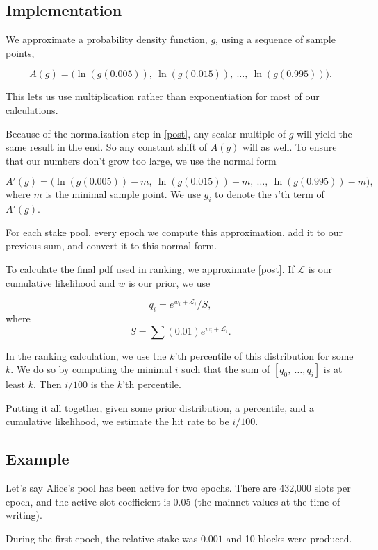 \documentclass[11pt,a4paper,dvipsnames,twosided]{article}
\begin{document}
\subsection{Implementation}

We approximate a probability density function, $g$, using a sequence of sample points,

\[ A(g) = \big(\ln(g(0.005)),~ \ln(g(0.015)),~ \ldots,~ \ln(g(0.995))\big). \]

This lets us use multiplication rather than exponentiation for most of our calculations.

Because of the normalization step in \eqref{post}, any scalar multiple of $g$
will yield the same result in the end. So any constant shift of $A(g)$ will as well.
To ensure that our numbers don't grow too large, we use the normal form

\[ A'(g) = \big(\ln(g(0.005)) - m,~ \ln(g(0.015)) - m,~ \ldots,~ \ln(g(0.995)) - m\big), \]
where $m$ is the minimal sample point. We use $g_i$ to denote the $i$'th term of $A'(g)$.

For each stake pool, every epoch we compute this approximation, add it to our previous sum, and convert it to this normal form.

To calculate the final pdf used in ranking, we approximate \eqref{post}.
If $\mathcal{L}$ is our cumulative likelihood
and $w$ is our prior, we use

\[ q_i = e^{w_i + \mathcal{L}_i} / S, \]
where
\[ S = \sum (0.01) e^{w_i + \mathcal{L}_i}. \]

In the ranking calculation, we use the $k$'th percentile of this distribution for some $k$.
We do so by computing the minimal $i$ such that the sum of $[q_0,~\ldots,q_i]$ is at least $k$.
Then $i/100$ is the $k$'th percentile.

Putting it all together, given some prior distribution,
a percentile, and a cumulative likelihood,
we estimate the hit rate to be $i/100$.


\subsection{Example}

Let's say Alice's pool has been active for two epochs.
There are 432,000 slots per epoch, and the active slot coefficient is 0.05
(the mainnet values at the time of writing).

During the first epoch, the relative stake was $0.001$ and 10 blocks were produced.
\end{document}
